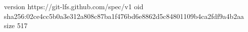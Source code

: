 version https://git-lfs.github.com/spec/v1
oid sha256:02ce4cc5b0a3e312a808c87ba1f476bd6e8862d5c84801109b4ca2fdf9a4b2aa
size 517
